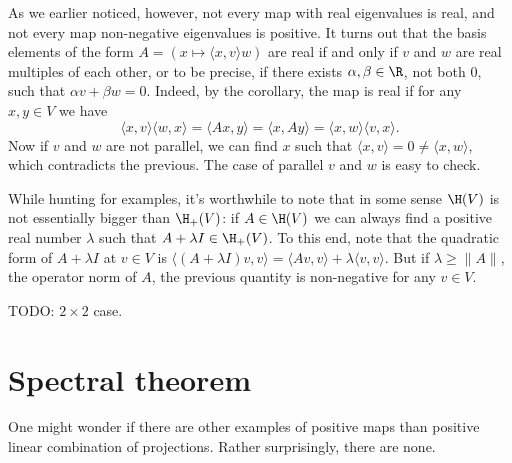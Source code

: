 As we earlier noticed, however, not every map with real eigenvalues is real, and not every map non-negative eigenvalues is positive. It turns out that the basis elements of the form $A = (x \mapsto \langle x, v \rangle w)$ are real if and only if $v$ and $w$ are real multiples of each other, or to be precise, if there exists $\alpha, \beta \in \R$, not both $0$, such that $\alpha v + \beta w = 0$. Indeed, by the corollary, the map is real if for any $x, y \in V$ we have
\[
	\langle x, v \rangle \langle w, x \rangle = \langle A x, y \rangle = \langle x, A y \rangle = \langle x, w \rangle \langle v, x \rangle.
\]
Now if $v$ and $w$ are not parallel, we can find $x$ such that $\langle x, v \rangle = 0 \neq \langle x, w \rangle$, which contradicts the previous. The case of parallel $v$ and $w$ is easy to check.

While hunting for examples, it's worthwhile to note that in some sense $\H(V)$ is not essentially bigger than $\H_{+}(V)$: if $A \in \H(V)$ we can always find a positive real number $\lambda$ such that $A + \lambda I \in \H_{+}(V)$.
To this end, note that the quadratic form of $A + \lambda I$ at $v \in V$ is $\langle (A + \lambda I) v, v \rangle = \langle A v, v \rangle + \lambda \langle v, v \rangle$. But if $\lambda \geq \|A\|$, the operator norm of $A$, the previous quantity is non-negative for any $v \in V$.

TODO: $2 \times 2$ case.

\section{Spectral theorem}

One might wonder if there are other examples of positive maps than positive linear combination of projections. Rather surprisingly, there are none.

